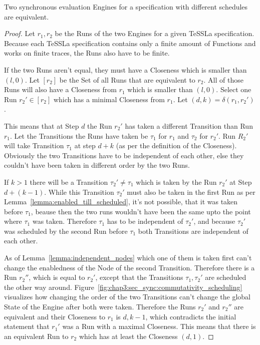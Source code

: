 \begin{theorem}[name = Equivalence of different synchronous evaluation Engines]\label{theorem:equivalence_sync_eval_engines}
  Two synchronous evaluation Engines for a specification with different schedules are equivalent.
\end{theorem}
\begin{proof}

Let \(r_1, r_2\) be the Runs of the two Engines for a given TeSSLa specification.
Because each TeSSLa specification contains only a finite amount of Functions and works on finite traces, the Runs also have to be finite.

If the two Runs aren't equal, they must have a Closeness which is smaller than \((l, 0)\).
Let \([r_2]\) be the Set of all Runs that are equivalent to \(r_2\).
All of those Runs will also have a Closeness from \(r_1\) which is smaller than \((l, 0)\).
Select one Run \(r_2' \in [r_2]\) which has a minimal Closeness from \(r_1\).
Let \((d,k) = \delta(r_1, r_2')\).

This means that at Step \(d\) the Run \(r_2'\) has taken a different Transition than Run \(r_1\).
Let the Transitions the Runs have taken be \(\tau_1\) for \(r_1\) and \(\tau_2\) for \(r_2'\).
Run \(R_2'\) will take Transition \(\tau_1\) at step \(d+k\) (as per the definition of the Closeness).
Obviously the two Transitions have to be independent of each other, else they couldn't have been taken in different order by the two Runs.

If \(k > 1\) there will be a Transition \(\tau_2' \neq \tau_1\) which is taken by the Run \(r_2'\) at Step \(d+(k-1)\).
While this Transition \(\tau_2'\) must also be taken in the first Run as per Lemma~\ref{lemma:enabled_till_scheduled}, it's not possible, that it was taken before \(\tau_1\), beause then the two runs wouldn't have been the same upto the point where \(\tau_1\) was taken.
Therefore \(\tau_1\) has to be independent of \(\tau_2'\), and because \(\tau_2'\) was scheduled by the second Run before \(\tau_1\) both Transitions are independent of each other.

As of Lemma~\ref{lemma:independent_nodes} which one of them is taken first can't change the enabledness of the Node of the second Transition.
Therefore there is a Run \(r_2''\), which is equal to \(r_2'\), except that the Transitions \(\tau_1, \tau_2'\) are scheduled the other way around.
Figure~\ref{fig:chap3:sec_sync:commutativity_scheduling} visualizes how changing the order of the two Transitions can't change the global State of the Engine after both were taken.
Therefore the Runs \(r_2'\) and \(r_2''\) are equivalent and their Closeness to \(r_1\) is \(d, k-1\), which contradicts the initial statement that \(r_1'\) was a Run with a maximal Closeness.
This means that there is an equivalent Run to \(r_2\) which has at least the Closeness \((d, 1)\).


\end{proof}
